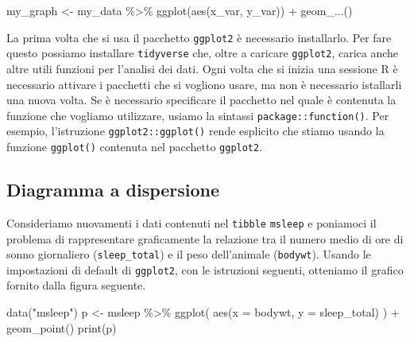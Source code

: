 \documentclass[
  11pt,
]{krantz}
\makeatletter
\newenvironment{Shaded}{\begin{snugshade}}{\end{snugshade}}
\newcommand{\AttributeTok}[1]{\textcolor[rgb]{0.61,0.61,0.61}{#1}}
\newcommand{\FunctionTok}[1]{\textcolor[rgb]{0,0,0}{#1}}
\newcommand{\NormalTok}[1]{#1}
\newcommand{\OtherTok}[1]{\textcolor[rgb]{0.37,0.37,0.37}{#1}}
\newcommand{\SpecialCharTok}[1]{\textcolor[rgb]{0,0,0}{#1}}
\newcommand{\StringTok}[1]{\textcolor[rgb]{0.5,0.5,0.5}{#1}}
\newenvironment{kframe}{%
\medskip{}
\setlength{\fboxsep}{.8em}
 \def\at@end@of@kframe{}%
 \ifinner\ifhmode%
  \def\at@end@of@kframe{\end{minipage}}%
  \begin{minipage}{\columnwidth}%
 \fi\fi%
 \def\FrameCommand##1{\hskip\@totalleftmargin \hskip-\fboxsep
 \colorbox{shadecolor}{##1}\hskip-\fboxsep
     \hskip-\linewidth \hskip-\@totalleftmargin \hskip\columnwidth}%
 \MakeFramed {\advance\hsize-\width
   \@totalleftmargin\z@ \linewidth\hsize
   \@setminipage}}%
 {\par\unskip\endMakeFramed%
 \at@end@of@kframe}
\renewenvironment{Shaded}{\begin{kframe}}{\end{kframe}}
\theoremstyle{definition}
\theoremstyle{definition}
\theoremstyle{definition}
\theoremstyle{definition}
\theoremstyle{remark}
\makeatother
\begin{document}
\begin{Shaded}
\begin{Highlighting}[]
\NormalTok{my\_graph }\OtherTok{\textless{}{-}}\NormalTok{ my\_data }\SpecialCharTok{\%\textgreater{}\%} 
  \FunctionTok{ggplot}\NormalTok{(}\FunctionTok{aes}\NormalTok{(x\_var, y\_var)) }\SpecialCharTok{+}
  \FunctionTok{geom\_...}\NormalTok{()}
\end{Highlighting}
\end{Shaded}

La prima volta che si usa il pacchetto \texttt{ggplot2} è necessario installarlo. Per fare questo possiamo installare \texttt{tidyverse} che, oltre a caricare \texttt{ggplot2}, carica anche altre utili funzioni per l'analisi dei dati. Ogni volta che si inizia una sessione R è necessario attivare i pacchetti che si vogliono usare, ma non è necessario istallarli una nuova volta. Se è necessario specificare il pacchetto nel quale è contenuta la funzione che vogliamo utilizzare, usiamo la sintassi \texttt{package::function()}. Per esempio, l'istruzione \texttt{ggplot2::ggplot()} rende esplicito che stiamo usando la funzione \texttt{ggplot()} contenuta nel pacchetto \texttt{ggplot2}.

\hypertarget{diagramma-a-dispersione}{%
\subsection{Diagramma a dispersione}\label{diagramma-a-dispersione}}

Consideriamo nuovamenti i dati contenuti nel \texttt{tibble} \texttt{msleep} e poniamoci il problema di rappresentare graficamente la relazione tra il numero medio di ore di sonno giornaliero (\texttt{sleep\_total}) e il peso dell'animale (\texttt{bodywt}). Usando le impostazioni di default di \texttt{ggplot2}, con le istruzioni seguenti, otteniamo il grafico fornito dalla figura seguente.

\begin{Shaded}
\begin{Highlighting}[]
\FunctionTok{data}\NormalTok{(}\StringTok{"msleep"}\NormalTok{)}
\NormalTok{p }\OtherTok{\textless{}{-}}\NormalTok{ msleep }\SpecialCharTok{\%\textgreater{}\%} 
  \FunctionTok{ggplot}\NormalTok{(}
    \FunctionTok{aes}\NormalTok{(}\AttributeTok{x =}\NormalTok{ bodywt, }\AttributeTok{y =}\NormalTok{ sleep\_total)}
\NormalTok{  ) }\SpecialCharTok{+}
  \FunctionTok{geom\_point}\NormalTok{()}
\FunctionTok{print}\NormalTok{(p)}
\end{Highlighting}
\end{Shaded}
\end{document}
